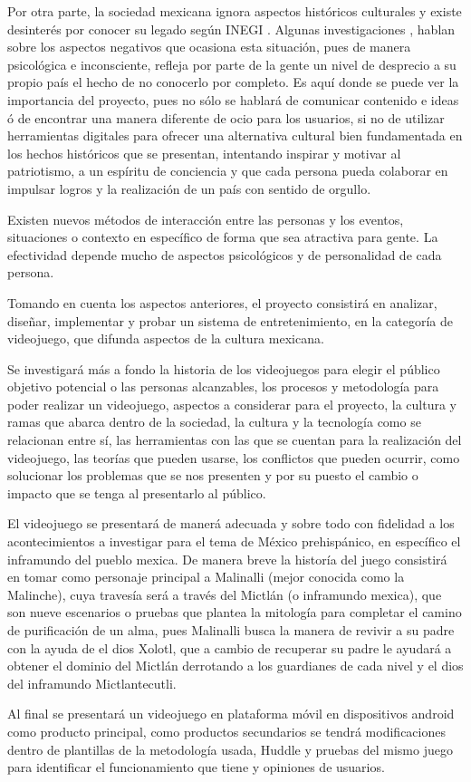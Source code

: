Por otra parte, la sociedad mexicana ignora aspectos históricos culturales y existe desinterés por conocer su legado
según INEGI \cite{inegi2017}. Algunas investigaciones \cite{guillermobonfilbatalla1987}, hablan sobre los aspectos negativos que 
ocasiona esta situación, pues de manera psicológica e inconsciente, refleja por parte de la gente un nivel de desprecio
a su propio país el hecho de no conocerlo por completo. Es aquí donde se puede ver la importancia del proyecto, pues no
sólo se hablará de comunicar contenido e ideas ó de encontrar una manera diferente de ocio para los usuarios, 
si no de utilizar herramientas digitales para %
ofrecer una alternativa cultural bien fundamentada en los hechos históricos que se presentan, intentando inspirar y motivar al patriotismo, 
a un espíritu de conciencia y que cada persona pueda colaborar en impulsar logros y la realización 
de un país con sentido de orgullo.

Existen nuevos métodos de interacción entre las personas y los eventos, situaciones o contexto en específico de forma 
que sea atractiva para gente. La efectividad depende mucho de aspectos psicológicos y de personalidad de cada persona.

Tomando en cuenta los aspectos anteriores, el proyecto consistirá en %
analizar, diseñar, implementar y probar un sistema de entretenimiento, en la categoría de videojuego, 
que %
difunda aspectos de la cultura mexicana.

Se investigará más a fondo la historia de los videojuegos para elegir el público objetivo potencial o las personas alcanzables, los procesos y metodología para poder realizar un videojuego, aspectos a considerar para el proyecto, la cultura y ramas que abarca dentro de la sociedad, la cultura y la tecnología como se relacionan entre sí, las herramientas con las que se cuentan para la realización del videojuego, las teorías que pueden usarse, los conflictos que pueden ocurrir, como solucionar los problemas que se nos presenten y por su puesto el cambio o impacto que se tenga al presentarlo al público.

El videojuego se presentará de manerá adecuada y sobre todo con fidelidad a los acontecimientos a investigar para el tema de México prehispánico, en específico el inframundo del pueblo mexica. De manera breve la historía del juego consistirá en tomar como personaje principal a Malinalli (mejor conocida como la Malinche), cuya travesía será a través del Mictlán (o inframundo mexica), que son nueve escenarios o pruebas que plantea la mitología para completar el camino de purificación de un alma, pues Malinalli busca la manera de revivir a su padre con la ayuda de el dios Xolotl, que a cambio de recuperar su padre le ayudará a obtener el dominio del Mictlán derrotando a los guardianes de cada nivel y el dios del inframundo Mictlantecutli.

Al final se presentará un videojuego en plataforma móvil en dispositivos android como producto principal, como productos secundarios se tendrá modificaciones dentro de plantillas de la metodología usada, Huddle y pruebas del mismo juego para identificar el funcionamiento que tiene y opiniones de usuarios.